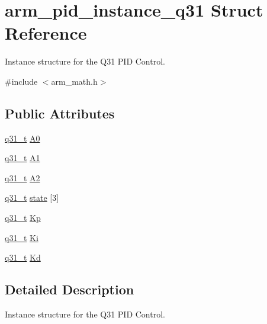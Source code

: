 \hypertarget{structarm__pid__instance__q31}{}\section{arm\+\_\+pid\+\_\+instance\+\_\+q31 Struct Reference}
\label{structarm__pid__instance__q31}


Instance structure for the Q31 P\+ID Control.  




{\ttfamily \#include $<$arm\+\_\+math.\+h$>$}

\subsection*{Public Attributes}
\begin{DoxyCompactItemize}
\item 
\hyperlink{arm__math_8h_adc89a3547f5324b7b3b95adec3806bc0}{q31\+\_\+t} \hyperlink{structarm__pid__instance__q31_aa5332635ce9c7078cdb4c1ecf442eadd}{A0}
\item 
\hyperlink{arm__math_8h_adc89a3547f5324b7b3b95adec3806bc0}{q31\+\_\+t} \hyperlink{structarm__pid__instance__q31_a2f7492bd6fb92fae5e2de7fbbec39b0e}{A1}
\item 
\hyperlink{arm__math_8h_adc89a3547f5324b7b3b95adec3806bc0}{q31\+\_\+t} \hyperlink{structarm__pid__instance__q31_a3e34537c53af4f9ad7bfffa4dff27c82}{A2}
\item 
\hyperlink{arm__math_8h_adc89a3547f5324b7b3b95adec3806bc0}{q31\+\_\+t} \hyperlink{structarm__pid__instance__q31_a228e4a64da6014844a0a671a1fa391d4}{state} \mbox{[}3\mbox{]}
\item 
\hyperlink{arm__math_8h_adc89a3547f5324b7b3b95adec3806bc0}{q31\+\_\+t} \hyperlink{structarm__pid__instance__q31_ac2410bf7f856d58dc1d773d4983cac8e}{Kp}
\item 
\hyperlink{arm__math_8h_adc89a3547f5324b7b3b95adec3806bc0}{q31\+\_\+t} \hyperlink{structarm__pid__instance__q31_aa861d69fd398f29aa0b4b455a823ed72}{Ki}
\item 
\hyperlink{arm__math_8h_adc89a3547f5324b7b3b95adec3806bc0}{q31\+\_\+t} \hyperlink{structarm__pid__instance__q31_aab4ff371d14441df501f1169f71cbd17}{Kd}
\end{DoxyCompactItemize}


\subsection{Detailed Description}
Instance structure for the Q31 P\+ID Control. 

